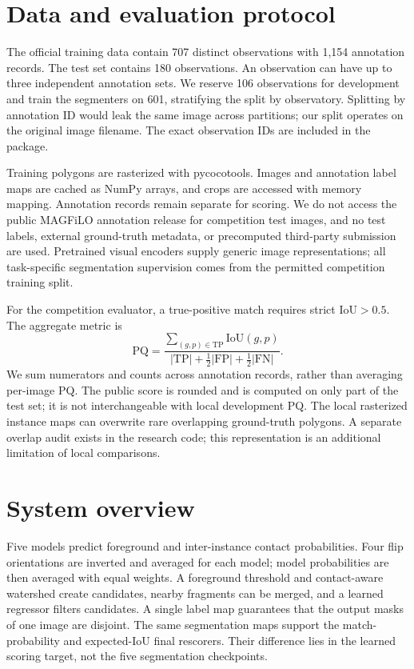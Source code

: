 \documentclass[sigconf,nonacm]{acmart}
\begin{document}
\section{Data and evaluation protocol}
The official training data contain 707 distinct observations with 1,154
annotation records. The test set contains 180 observations. An observation
can have up to three independent annotation sets. We reserve 106 observations
for development and train the segmenters on 601, stratifying the split by
observatory. Splitting by annotation ID would leak the same image across
partitions; our split operates on the original image filename. The exact
observation IDs are included in the package.

Training polygons are rasterized with pycocotools. Images and annotation
label maps are cached as NumPy arrays, and crops are accessed with memory
mapping. Annotation records remain separate for scoring. We do not access
the public MAGFiLO annotation release for competition test images, and no
test labels, external ground-truth metadata, or precomputed third-party
submission are used. Pretrained visual encoders supply generic image
representations; all task-specific segmentation supervision comes from the
permitted competition training split.

For the competition evaluator, a true-positive match requires strict
$\mathrm{IoU}>0.5$. The aggregate metric is
\begin{equation}
\mathrm{PQ}=\frac{\sum_{(g,p)\in\mathrm{TP}}\mathrm{IoU}(g,p)}
{|\mathrm{TP}|+\tfrac12|\mathrm{FP}|+\tfrac12|\mathrm{FN}|}.
\end{equation}
We sum numerators and counts across annotation records, rather than
averaging per-image PQ. The public score is rounded and is computed on
only part of the test set; it is not interchangeable with local development
PQ. The local rasterized instance maps can overwrite rare overlapping
ground-truth polygons. A separate overlap audit exists in the research code;
this representation is an additional limitation of local comparisons.

\section{System overview}
Five models predict foreground and inter-instance contact probabilities.
Four flip orientations are inverted and averaged for each model; model
probabilities are then averaged with equal weights. A foreground threshold
and contact-aware watershed create candidates, nearby fragments can be
merged, and a learned regressor filters candidates. A single label map
guarantees that the output masks of one image are disjoint. The same
segmentation maps support the match-probability and expected-IoU final
rescorers. Their difference lies in the learned scoring target, not the
five segmentation checkpoints.
\end{document}
